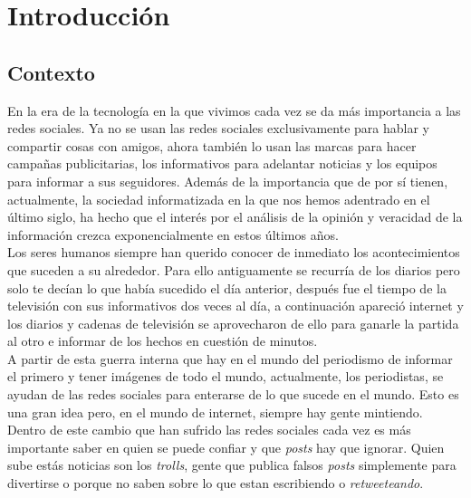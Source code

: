 \documentclass[../all.tex]{subfiles}
\begin{document}
\section{Introducción}
\subsection{Contexto} %
    
    En la era de la tecnología en la que vivimos cada vez se da más importancia a las redes sociales. Ya no se usan las redes sociales exclusivamente para hablar y compartir cosas con amigos, ahora también lo usan las marcas para hacer campañas publicitarias, los informativos para adelantar noticias y los equipos para informar a sus seguidores. Además de la importancia que de por sí tienen, actualmente, la sociedad informatizada en la que nos hemos adentrado en el último siglo, ha hecho que el interés por el análisis de la opinión y veracidad de la información crezca exponencialmente en estos últimos años.\\
    \newline
    Los seres humanos siempre han querido conocer de inmediato los acontecimientos que suceden a su alrededor. Para ello antiguamente se recurría de los diarios pero solo te decían lo que había sucedido el día anterior, después fue el tiempo de la televisión con sus informativos dos veces al día, a continuación apareció internet y los diarios y cadenas de televisión se aprovecharon de ello para ganarle la partida al otro e informar de los hechos en cuestión de minutos.\\
    \newline
    A partir de esta guerra interna que hay en el mundo del periodismo de informar el primero y tener imágenes de todo el mundo, actualmente, los periodistas, se ayudan de las redes sociales para enterarse de lo que sucede en el mundo. Esto es una gran idea pero, en el mundo de internet, siempre hay gente mintiendo.\\
    \newline
    Dentro de este cambio que han sufrido las redes sociales cada vez es más importante saber en quien se puede confiar y que \textit{posts} hay que ignorar. Quien sube estás noticias son los \textit{trolls}, gente que publica falsos \textit{posts} simplemente para divertirse o porque no saben sobre lo que estan escribiendo o \textit{retweeteando}.\\
    \newline
\end{document}

